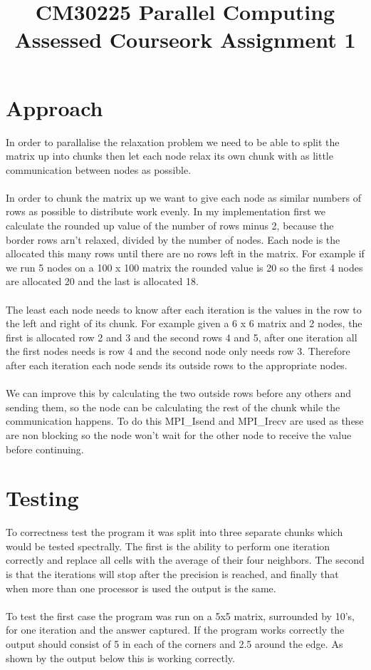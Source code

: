 \documentclass{article}
\begin{document}
\title{CM30225 Parallel Computing \\ Assessed Courseork Assignment 1}
\author{}

\maketitle

\section{Approach}

In order to parallalise the relaxation problem we need to be able to split the matrix
up into chunks then let each node relax its own chunk with as little communication
between nodes as possible.\\~\\
In order to chunk the matrix up we want to give each node as similar numbers of
rows as possible to distribute work evenly. In my implementation first we calculate
the rounded up value of the number of rows minus 2, because the border rows arn't relaxed,
divided by the number of nodes. Each node is the allocated this many rows until
there are no rows left in the matrix. For example if we run 5 nodes on a 100 x 100 matrix
the rounded value is 20 so the first 4 nodes are allocated 20 and the last is allocated
18.\\~\\
The least each node needs to know after each iteration is the values in the row
to the left and right of its chunk. For example given a 6 x 6 matrix and 2 nodes,
the first is allocated row 2 and 3 and the second rows 4 and 5, after one iteration
all the first nodes needs is row 4 and the second node only needs row 3. Therefore
after each iteration each node sends its outside rows to the appropriate nodes.\\~\\
We can improve this by calculating the two outside rows before any others and sending
them, so the node can be calculating the rest of the chunk while the communication
happens. To do this MPI\_Isend and MPI\_Irecv are used as these are non blocking
so the node won't wait for the other node to receive the value before continuing.

\section{Testing}

To correctness test the program it was split into three separate chunks which would
be tested spectrally. The first is the ability to perform one iteration correctly and
replace all cells with the average of their four neighbors. The second is that
the iterations will stop after the precision is reached, and finally that when more
than one processor is used the output is the same.\\~\\
To test the first case the program was run on a 5x5 matrix, surrounded by 10's, for one iteration and the
answer captured. If the program works correctly the output should consist of 5
in each of the corners and 2.5 around the edge. As shown by the output below this is
working correctly.
\end{document}
